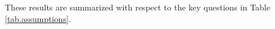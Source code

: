 These results are summarized with respect to the key questions in Table \ref{tab.assumptions}.

%
%
%
